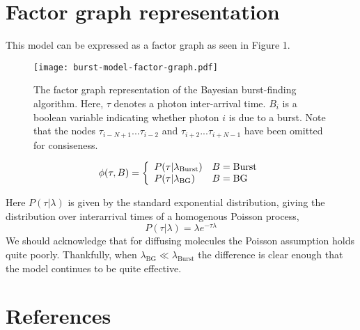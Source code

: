 \documentclass{article}
\newcommand{\lburst}{\ensuremath{\lambda_\mathrm{Burst}}}
\newcommand{\lbg}{\ensuremath{\lambda_\mathrm{BG}}}
\begin{document}
\section{Factor graph representation}

This model can be expressed as a factor graph as seen in Figure 1.

\begin{figure}
\centering
\texttt{[image: burst-model-factor-graph.pdf]}
\caption{The factor graph representation of the Bayesian burst-finding
algorithm. Here, $\tau$ denotes a photon inter-arrival time. $B_i$ is
a boolean variable indicating whether photon $i$ is due to a
burst. Note that the nodes $\tau_{i-N+1} ... \tau_{i-2}$ and
$\tau_{i+2} ... \tau_{i+N-1}$ have been omitted for consiseness.}
\end{figure}

\begin{equation}
  \phi(\tau, B) = \left\{
    \begin{array}{l l}
      P(\tau \vert \lambda_\mathrm{Burst})  & B = \mathrm{Burst} \\
      P(\tau \vert \lambda_\mathrm{BG})     & B = \mathrm{BG} \\
    \end{array}
  \right.
\end{equation}

Here $P(\tau \vert \lambda)$ is given by the standard exponential
distribution, giving the distribution over interarrival times of a
homogenous Poisson process,
\[ P(\tau \vert \lambda) = \lambda e^{-\tau \lambda} \]
We should acknowledge that for diffusing molecules the Poisson assumption
holds quite poorly. Thankfully, when $\lbg \ll \lburst$ the difference
is clear enough that the model continues to be quite effective.

\appendix
\section{References}


\end{document}
